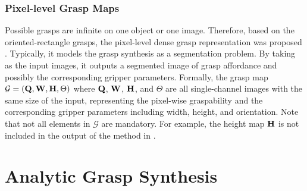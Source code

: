 \documentclass[letterpaper,10pt]{article}
\newcommand{\gmap}{\mathcal{G}}
\begin{document}
\subsubsection{Pixel-level Grasp Maps}
\label{sec:pixel-grasp-repr}

Possible grasps are infinite on one object or one image. Therefore, based on the oriented-rectangle grasps, the pixel-level dense grasp representation was proposed \cite{asif2018graspnet, wang2019efficient, gkanatsios2020orientation, wang2021high}. Typically, it models the grasp synthesis as a segmentation problem. By taking as the input images, it outputs a segmented image of grasp affordance and possibly the corresponding gripper parameters. Formally, the grasp map $\gmap=({\bf Q}, {\bf W}, {\bf H},{\Theta})$ where ${\bf Q}$, ${\bf W}$, ${\bf H}$, and ${\Theta}$ are all single-channel images with the same size of the input, representing the pixel-wise graspability and the corresponding gripper parameters including width, height, and orientation. Note that not all elements in $\gmap$ are mandatory. For example, the height map ${\bf H}$ is not included in the output of the method in \cite{gkanatsios2020orientation}.

\section{Analytic Grasp Synthesis}
\label{sec:analytic-grasp}
\end{document}

